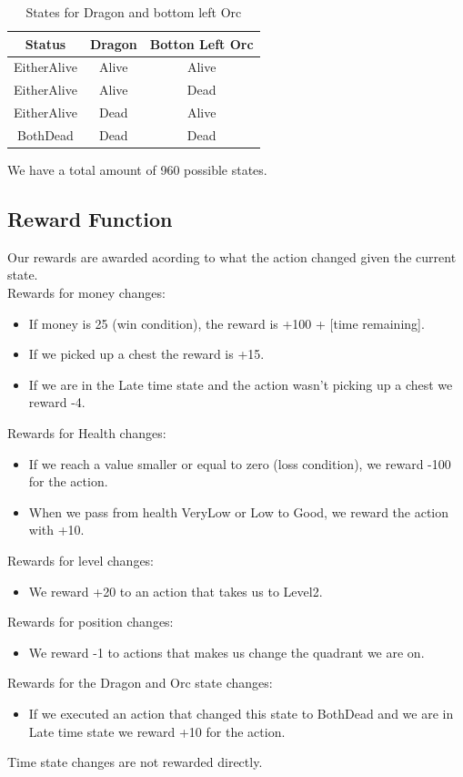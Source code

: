 \documentclass{article}
\begin{document}
  \begin{table}[h!]
    \centering
    \caption{States for Dragon and bottom left Orc}
    \label{tab:enemiesStates2}
    \begin{tabular}{c|c|c}
      \textbf{Status} & \textbf{Dragon} & \textbf{Botton Left Orc}\\
      \hline
      EitherAlive & Alive & Alive\\
      EitherAlive & Alive & Dead\\
      EitherAlive & Dead & Alive\\
      BothDead & Dead & Dead\\
    \end{tabular}
  \end{table}
  \noindent
  We have a total amount of 960 possible states.

  \subsection{Reward Function}
  Our rewards are awarded acording to what the action changed given the current state.\\
  Rewards for money changes:
  \begin{itemize}
    \item If money is 25 (win condition), the reward is +100 + [time remaining].
    \item If we picked up a chest the reward is +15.
    \item If we are in the Late time state and the action wasn't picking up a chest we reward -4.
  \end{itemize}
  Rewards for Health changes:
  \begin{itemize}
    \item If we reach a value smaller or equal to zero (loss condition), we reward -100 for the action.
    \item When we pass from health VeryLow or Low to Good, we reward the action with +10.
  \end{itemize}
  Rewards for level changes:
  \begin{itemize}
    \item We reward +20 to an action that takes us to Level2.
  \end{itemize}
  Rewards for position changes:
  \begin{itemize}
    \item We reward -1 to actions that makes us change the quadrant we are on.
  \end{itemize}
  Rewards for the Dragon and Orc state changes:
  \begin{itemize}
    \item If we executed an action that changed this state to BothDead and we are in Late time state we reward +10 for the action.
  \end{itemize}
  Time state changes are not rewarded directly.\\
\end{document}
